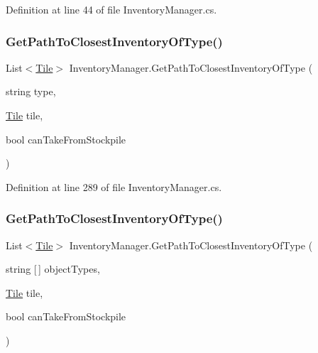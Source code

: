 Definition at line 44 of file Inventory\+Manager.\+cs.

\mbox{\label{class_inventory_manager_a3924e3be39b67aaa47ba850228917814}} 
\subsubsection{\texorpdfstring{Get\+Path\+To\+Closest\+Inventory\+Of\+Type()}{GetPathToClosestInventoryOfType()}\hspace{0.1cm}{\footnotesize\ttfamily [1/2]}}
{\footnotesize\ttfamily List$<$\hyperlink{class_tile}{Tile}$>$ Inventory\+Manager.\+Get\+Path\+To\+Closest\+Inventory\+Of\+Type (\begin{DoxyParamCaption}\item[{string}]{type,  }\item[{\hyperlink{class_tile}{Tile}}]{tile,  }\item[{bool}]{can\+Take\+From\+Stockpile }\end{DoxyParamCaption})}



Definition at line 289 of file Inventory\+Manager.\+cs.

\mbox{\label{class_inventory_manager_a0baa049dc3137ae1fd8451c4b89fefaa}} 
\subsubsection{\texorpdfstring{Get\+Path\+To\+Closest\+Inventory\+Of\+Type()}{GetPathToClosestInventoryOfType()}\hspace{0.1cm}{\footnotesize\ttfamily [2/2]}}
{\footnotesize\ttfamily List$<$\hyperlink{class_tile}{Tile}$>$ Inventory\+Manager.\+Get\+Path\+To\+Closest\+Inventory\+Of\+Type (\begin{DoxyParamCaption}\item[{string \mbox{[}$\,$\mbox{]}}]{object\+Types,  }\item[{\hyperlink{class_tile}{Tile}}]{tile,  }\item[{bool}]{can\+Take\+From\+Stockpile }\end{DoxyParamCaption})}




